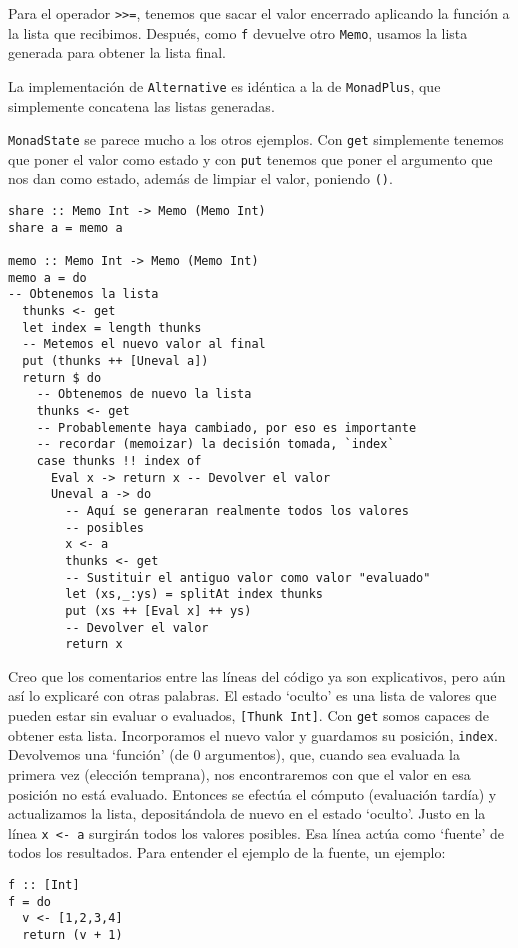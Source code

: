 \documentclass[class=article, crop=false]{standalone}
\begin{document}
Para el operador \verb`>>=`, tenemos que sacar el valor encerrado aplicando la función a la
lista que recibimos. Después, como \verb`f` devuelve otro \verb`Memo`, usamos la lista
generada para obtener la lista final.

La implementación de \verb`Alternative` es idéntica a la de \verb`MonadPlus`, que simplemente
concatena las listas generadas.

\verb`MonadState` se parece mucho a los otros ejemplos. Con \verb`get` simplemente tenemos
que poner el valor como estado y con \verb`put` tenemos que poner el argumento que nos dan
como estado, además de limpiar el valor, poniendo \verb`()`.

\begin{verbatim}
share :: Memo Int -> Memo (Memo Int)
share a = memo a

memo :: Memo Int -> Memo (Memo Int)
memo a = do
-- Obtenemos la lista
  thunks <- get
  let index = length thunks
  -- Metemos el nuevo valor al final
  put (thunks ++ [Uneval a])
  return $ do
    -- Obtenemos de nuevo la lista
    thunks <- get
    -- Probablemente haya cambiado, por eso es importante
    -- recordar (memoizar) la decisión tomada, `index`
    case thunks !! index of
      Eval x -> return x -- Devolver el valor
      Uneval a -> do
        -- Aquí se generaran realmente todos los valores
        -- posibles
        x <- a
        thunks <- get
        -- Sustituir el antiguo valor como valor "evaluado"
        let (xs,_:ys) = splitAt index thunks
        put (xs ++ [Eval x] ++ ys)
        -- Devolver el valor
        return x
\end{verbatim}

Creo que los comentarios entre las líneas del código ya son explicativos, pero aún así lo
explicaré con otras palabras. El estado `oculto' es una lista de valores que pueden estar sin
evaluar o evaluados, \verb`[Thunk Int]`. Con \verb`get` somos capaces de obtener esta lista.
Incorporamos el nuevo valor y guardamos su posición, \verb`index`. Devolvemos una `función'
(de 0 argumentos), que, cuando sea evaluada la primera vez (elección temprana), nos
encontraremos con que el valor en esa posición no está evaluado. Entonces se efectúa el
cómputo (evaluación tardía) y actualizamos la lista, depositándola de nuevo en el estado
`oculto'. Justo en la línea \verb`x <- a` surgirán todos los valores posibles. Esa línea
actúa como `fuente' de todos los resultados. Para entender el ejemplo de la fuente, un
ejemplo:
\begin{verbatim}
f :: [Int]
f = do
  v <- [1,2,3,4]
  return (v + 1)
\end{verbatim}
\end{document}
